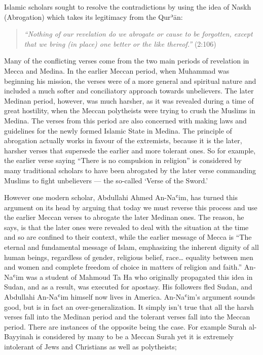 \documentclass[12pt]{memoir}
\def\´{ʾ} %
\def\`{ʿ} %
\def \Quran{Qur\-\´ān} %
\def\–{-\hskip0pt}
\newcommand{\QRef}[1]{{\color{darkblue}#1}}
\begin{document}
Islamic scholars sought to resolve the contradictions by using the idea
of Naskh (Abrogation) which takes its legitimacy from the \Quran:

\begin{quote}
\emph{“Nothing of our revelation do we abrogate or cause to be forgotten,
except that we bring (in place) one better or the like thereof.”}
(\QRef{2:106})
\end{quote}

Many of the conflicting verses come from the two main periods
of revelation in Mecca and Medina.
In the earlier Meccan period, when Muhammad was beginning his mission,
the verses were of a more general and spiritual nature and included
a much softer and conciliatory approach towards unbelievers.
The later Medinan period, however, was much harsher,
as it was revealed during a time of great hostility,
when the Meccan polytheists were trying to crush the Muslims in Medina.
The verses from this period are also concerned with making laws
and guidelines for the newly formed Islamic State in Medina.
The principle of abrogation actually works in favour of the extremists,
because it is the later, harsher verses
that supersede the earlier and more tolerant ones.
So for example, the earlier verse saying “There is no compulsion in religion”
is considered by many traditional scholars to have been abrogated
by the later verse commanding Muslims to fight unbelievers —
the so\–called ‘Verse of the Sword.’

However one modern scholar, Abdullahi Ahmed An\–Na\`im,
has turned this argument on its head by arguing
that today we must reverse this process
and use the earlier Meccan verses to abrogate the later Medinan ones.
The reason, he says, is that the later ones were revealed to deal
with the situation at the time and so are confined to their context,
while the earlier message of Mecca is
“The eternal and fundamental message of Islam,
emphasizing the inherent dignity of all human beings,
regardless of gender, religious belief, race…
equality between men and women and complete freedom of choice
in matters of religion and faith.”
An\–Na\`im was a student of Mahmoud Ta Ha who originally propagated this idea
in Sudan, and as a result, was executed for apostasy.
His followers fled Sudan, and Abdullahi An\–Na\`im himself
now lives in America.
An\–Na\`im’s argument sounds good, but is in fact an over\–generalization.
It simply isn’t true that all the harsh verses fall into the Medinan period
and the tolerant verses fall into the Meccan period.
There are instances of the opposite being the case.
For example Surah al\–Bayyinah is considered by many to be a Meccan Surah
yet it is extremely intolerant of Jews and Christians as well as polytheists;
\end{document}
